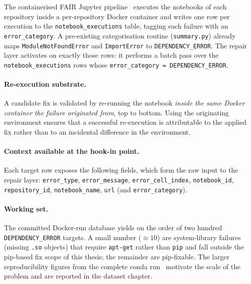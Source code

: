 The containerised FAIR Jupyter pipeline~\cite{samuel2025docker} %
executes the notebooks of each repository inside a per-repository Docker
container and writes one row per execution to the
\texttt{notebook\_executions} table, tagging each failure with an
\texttt{error\_category}. A pre-existing categorisation routine
(\texttt{summary.py}) already maps \texttt{ModuleNotFoundError} and
\texttt{ImportError} to \texttt{DEPENDENCY\_ERROR}. The repair layer
activates on exactly those rows: it performs a batch pass over the
\texttt{notebook\_executions} rows whose
\texttt{error\_category = DEPENDENCY\_ERROR}.

\paragraph{Re-execution substrate.}
A candidate fix is validated by re-running the notebook \emph{inside the
same Docker container the failure originated from}, top to bottom. Using
the originating environment ensures that a successful re-execution is
attributable to the applied fix rather than to an incidental difference
in the environment.

\paragraph{Context available at the hook-in point.}
Each target row exposes the following fields, which form the raw input to
the repair layer:
\texttt{error\_type}, \texttt{error\_message}, \texttt{error\_cell\_index},
\texttt{notebook\_id}, \texttt{repository\_id}, \texttt{notebook\_name},
\texttt{url} (and \texttt{error\_category}).

\paragraph{Working set.}
The committed Docker-run database yields on the order of two hundred
\texttt{DEPENDENCY\_ERROR} targets. A small number ($\approx 10$) are
system-library failures (missing \texttt{.so} objects) that require
\texttt{apt-get} rather than \texttt{pip} and fall outside the pip-based
fix scope of this thesis; the remainder are pip-fixable. The larger
reproducibility figures from the complete conda
run~\cite{samuel2024gigascience} %
motivate the scale of the problem and are reported in the dataset
chapter. %

